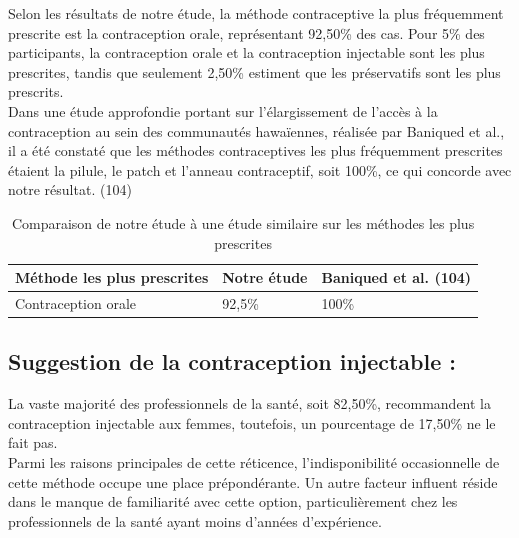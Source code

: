 \noindent Selon les résultats de notre étude, la méthode contraceptive la plus fréquemment prescrite est la contraception orale, représentant 92,50\% des cas. Pour 5\% des participants, la contraception orale et la contraception injectable sont les plus prescrites, tandis que seulement 2,50\% estiment que les préservatifs sont les plus prescrits. \\

\noindent Dans une étude approfondie portant sur l'élargissement de l’accès à la contraception au sein des communautés hawaïennes, réalisée par Baniqued et al., il a été constaté que les méthodes contraceptives les plus fréquemment prescrites étaient la pilule, le patch et l'anneau contraceptif, soit 100\%, ce qui concorde avec notre résultat. (104)

\begin{table}[H]
  \centering
  \renewcommand{\arraystretch}{1.5}

  \begin{spacing}{1.5} %
  \begin{tabularx}{\textwidth}{|p{6cm}|X|X|}
      \hline
      \textbf{Méthode les plus prescrites} & \textbf{Notre étude } & \textbf{Baniqued et al. (104)} \\
      \hline
      Contraception orale & 92,5\% & 100\%  \\
      
      
      \hline
  \end{tabularx}
\end{spacing}
\captionsetup{justification=centering} %
\caption{Comparaison de notre étude à une étude similaire sur les méthodes les plus prescrites}

\end{table}

\subsection{Suggestion de la contraception injectable : }

La vaste majorité des professionnels de la santé, soit 82,50\%, recommandent la contraception injectable aux femmes, toutefois, un pourcentage de 17,50\% ne le fait pas.\\

\noindent Parmi les raisons principales de cette réticence, l'indisponibilité occasionnelle de cette méthode occupe une place prépondérante. Un autre facteur influent réside dans le manque de familiarité avec cette option, particulièrement chez les professionnels de la santé ayant moins d’années d’expérience. \\

